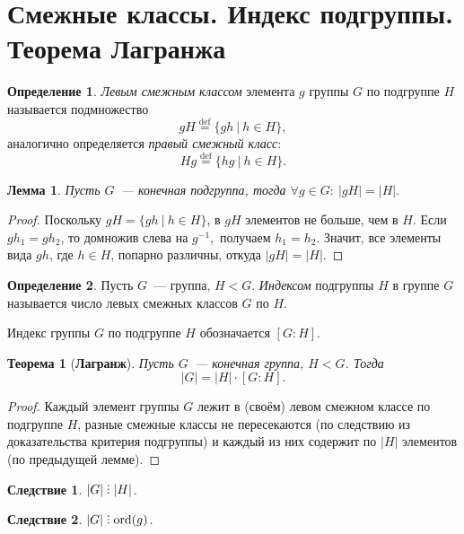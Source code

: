 \documentclass[a4paper, 14pt]{extarticle}
\newcommand{\deq}{\stackrel{\mathrm{def}}{=}}
\newcommand{\n}{\par}
\newcommand{\ord}{\mathrm{ord}}
\newcommand{\suchthat}{{:}{ } \ }
\DeclareRobustCommand{\divby}{%
	\mathrel{\text{\vbox{\baselineskip.65ex\lineskiplimit0pt\hbox{.}\hbox{.}\hbox{.}}}}%
}
\theoremstyle{definition}
\newtheorem{definition}{Определение}
\theoremstyle{plain}
\newtheorem*{theorem*}{Теорема}
\numberwithin{theorem}{section}
\numberwithin{definition}{section}
\numberwithin{statement}{section}
\newtheorem{lemma}{Лемма}
\numberwithin{lemma}{section}
\newtheorem{consequence}{Следствие}
\numberwithin{consequence}{section}
\begin{document}
	\section{Смежные классы. Индекс подгруппы. Теорема Лагранжа}
	\setcounter{definition}{0}
	\begin{definition}
		\textit{Левым смежным классом} элемента $g$ группы $G$ по подгруппе $H$ называется подмножество
		\begin{equation*}
			gH \deq \{gh \ | \ h \in H\},
		\end{equation*}
		аналогично определяется \textit{правый смежный класс}:
		\begin{equation*}
			Hg \deq \{hg \ | \ h \in H\}.
		\end{equation*}
	\end{definition}
	\begin{lemma}
		Пусть $G$~--- конечная подгруппа, тогда $\forall g \in G\suchthat |gH| = |H|.$
	\end{lemma}
	\begin{proof}
		Поскольку ${gH = \{gh \ | \ h \in H\}}$, в $gH$ элементов не больше, чем в $H$. Если ${gh_1 = gh_2}$, то домножив слева на $g^{-1},$ получаем ${h_1 = h_2}$. Значит, все элементы вида $gh$, где ${h \in H}$, попарно различны, откуда ${|gH| = |H|}$.
	\end{proof}
	\begin{definition}
		Пусть $G$~--- группа, $H < G$. \textit{Индексом} подгруппы $H$ в группе $G$ называется число левых смежных классов $G$ по $H$.
	\end{definition} \n
	Индекс группы $G$ по подгруппе $H$ обозначается $[G : H]$.
	\begin{theorem*}[\textbf{Лагранж}]
		Пусть $G$~--- конечная группа, $H < G$. Тогда
		\begin{equation*}
			|G| = |H| \cdot [G : H].
		\end{equation*}
	\end{theorem*}
	\begin{proof}
		Каждый элемент группы $G$ лежит в (своём) левом смежном классе по подгруппе $H$, разные смежные классы не пересекаются (по следствию из доказательства критерия подгруппы) и каждый из них содержит по $|H|$ элементов (по предыдущей лемме).
	\end{proof}
	\newpage
	\begin{consequence}
		$|G| \divby |H|$.
	\end{consequence}
	\begin{consequence}
		$|G| \divby \ord(g)$.
	\end{consequence}
\end{document}
